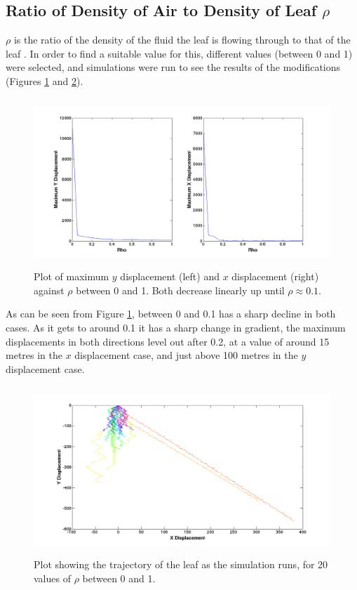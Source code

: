 \subsection{Ratio of Density of Air to Density of Leaf $\rho$}
$\rho$ is the ratio of the density of the fluid  the leaf is flowing through to that of the leaf \cite{leaf}. In order to find a suitable value for this, different values (between 0 and 1) were selected, and simulations were run to see the results of the modifications (Figures \ref{fig:rhomax} and \ref{fig:rho_xy}).
\begin{figure}[H]
	\centering
	\includegraphics[width=1\textwidth, height=2.5in]{Motion_Graphs/rho_max.png}
	\caption{Plot of maximum $y$ displacement (left) and $x$ displacement (right) against $\rho $ between 0 and 1. Both decrease linearly up until $\rho \approx 0.1 $.}\label{fig:rhomax}
\end{figure}
\noindent As can be seen from Figure \ref{fig:rhomax}, between 0 and 0.1 has a sharp decline in both cases. As it gets to around 0.1 it has a sharp change in gradient, the maximum displacements in both directions level out after 0.2, at a value of around 15 metres in the $x$ displacement case, and just above 100 metres in the $y$ displacement case.


\begin{figure}[H]
	\centering
	\includegraphics[width=1\linewidth, height=2.5in]{Motion_Graphs/rho_xy.png}
	\caption{Plot showing the trajectory of the leaf as the simulation runs, for 20 values of $\rho$ between 0 and 1. }\label{fig:rho_xy}
\end{figure}


